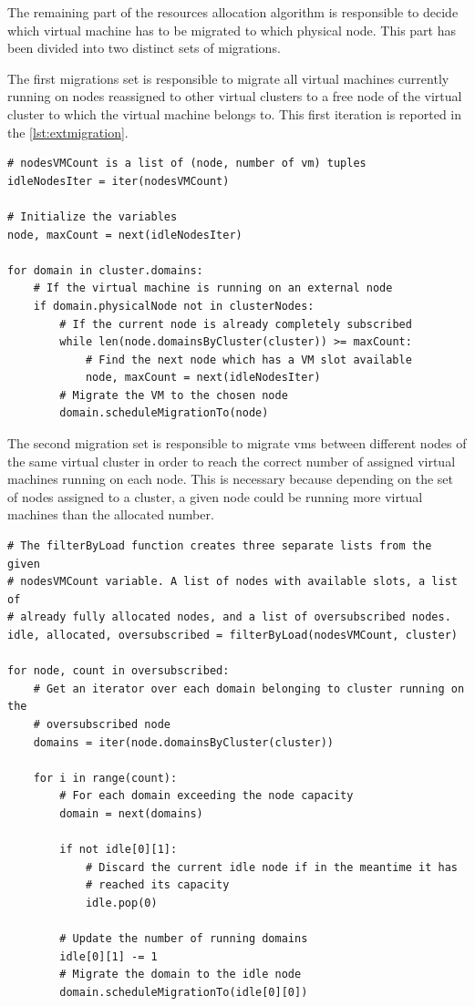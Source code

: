 The remaining part of the resources allocation algorithm is responsible to decide which virtual machine has to be migrated to which physical node. This part has been divided into two distinct sets of migrations.

The first migrations set is responsible to migrate all virtual machines currently running on nodes reassigned to other virtual clusters to a free node of the virtual cluster to which the virtual machine belongs to. This first iteration is reported in the \autoref{lst:extmigration}.

\lstset{language=python,caption=VMs migration from external nodes,label=lst:extmigration}
\begin{lstlisting}
# nodesVMCount is a list of (node, number of vm) tuples
idleNodesIter = iter(nodesVMCount)

# Initialize the variables
node, maxCount = next(idleNodesIter)

for domain in cluster.domains:
	# If the virtual machine is running on an external node
	if domain.physicalNode not in clusterNodes:
		# If the current node is already completely subscribed
		while len(node.domainsByCluster(cluster)) >= maxCount:
			# Find the next node which has a VM slot available
			node, maxCount = next(idleNodesIter)
		# Migrate the VM to the chosen node
		domain.scheduleMigrationTo(node)
\end{lstlisting}

The second migration set is responsible to migrate \glspl{vm} between different nodes of the same virtual cluster in order to reach the correct number of assigned virtual machines running on each node. This is necessary because depending on the set of nodes assigned to a cluster, a given node could be running more virtual machines than the allocated number.

\lstset{language=python,caption=Leveling node usage inside a virtual cluster,label=lst:insidemigration}
\begin{lstlisting}
# The filterByLoad function creates three separate lists from the given 
# nodesVMCount variable. A list of nodes with available slots, a list of 
# already fully allocated nodes, and a list of oversubscribed nodes.
idle, allocated, oversubscribed = filterByLoad(nodesVMCount, cluster)

for node, count in oversubscribed:
	# Get an iterator over each domain belonging to cluster running on the 
	# oversubscribed node
	domains = iter(node.domainsByCluster(cluster))
	
	for i in range(count):
		# For each domain exceeding the node capacity
		domain = next(domains)
		
		if not idle[0][1]:
			# Discard the current idle node if in the meantime it has 
			# reached its capacity
			idle.pop(0)

		# Update the number of running domains
		idle[0][1] -= 1
		# Migrate the domain to the idle node
		domain.scheduleMigrationTo(idle[0][0])
\end{lstlisting}

